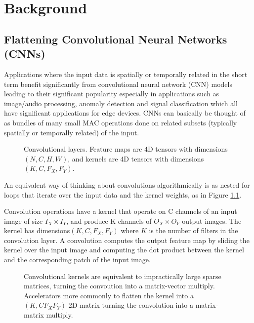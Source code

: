 \chapter{Background}

\section{Flattening Convolutional Neural Networks (CNNs)}

Applications where the input data is spatially or temporally related in the short term benefit significantly from convolutional neural network (CNN) models leading to their significant popularity especially in applications such as image/audio processing, anomaly detection and signal classification which all have significant applications for edge devices. CNNs can basically be thought of as bundles of many small MAC operations done on related subsets (typically spatially or temporally related) of the input.

\begin{figure}[htbp]
    \centering
    
    \caption{Convolutional layers. Feature maps are 4D tensors with dimensions $(N,C,H,W)$, and kernels are 4D tensors with dimensions $(K,C,F_X,F_Y)$.}
    \label{fig:convolution_algorithm}
\end{figure}

An equivalent way of thinking about convolutions algorithmically is as nested for loops that iterate over the input data and the kernel weights, as in Figure \ref{fig:convolution_algorithm}.

Convolution operations have a kernel that operate on C channels of an input image of size $I_X\times I_Y$, and produce K channels of $O_X\times O_Y$ output images. The kernel has dimensions$(K,C,F_X,F_Y)$ where $K$ is the number of filters in the convolution layer. A convolution computes the output feature map by sliding the kernel over the input image and computing the dot product between the kernel and the corresponding patch of the input image.

\begin{figure}[htbp]
    \centering
    
    \caption{Convolutional kernels are equivalent to impractically large sparse matrices, turning the convoution into a matrix-vector multiply. Accelerators more commonly to flatten the kernel into a $(K,CF_XF_Y)$ 2D matrix turning the convolution into a matrix-matrix multiply.}
    \label{fig:conv_flattening}
\end{figure}

